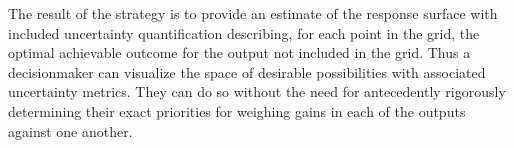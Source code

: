 \documentclass[12pt]{article}
\begin{document}
%

%
The result of the strategy is to provide an estimate of the response surface with included uncertainty quantification describing, for each point in the grid, the optimal achievable outcome for the output not included in the grid.
%
Thus a decisionmaker can visualize the space of desirable possibilities with associated uncertainty metrics. 
%
They can do so without the need for antecedently rigorously determining their exact priorities for weighing gains in each of the outputs against one another.
\end{document}
